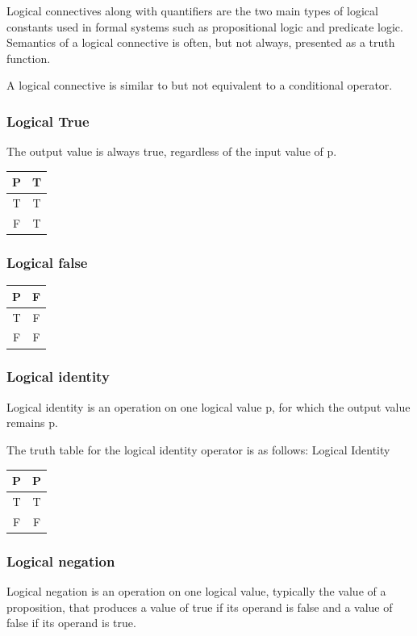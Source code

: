 \documentclass{article}
\begin{document}
Logical connectives along with quantifiers are the two main types of logical constants used in formal systems such as propositional logic and predicate logic. Semantics of a logical connective is often, but not always, presented as a truth function.

A logical connective is similar to but not equivalent to a conditional operator.
\subsubsection{Logical True}
The output value is always true, regardless of the input value of p.


\begin{center}
\begin{tabular}{ |c|c|} 
\hline
P&T \\ 
\hline
T&T \\ 
\hline
F&T \\ 
\hline
\end{tabular}
\end{center}
\subsubsection{Logical false}

 \begin{center}
\begin{tabular}{ |c|c|} 
\hline
P&F \\ 
\hline
T&F \\ 
\hline
F&F \\ 
\hline
\end{tabular}
\end{center}
\subsubsection{Logical identity}
Logical identity is an operation on one logical value p, for which the output value remains p.

The truth table for the logical identity operator is as follows:
Logical Identity 
 \begin{center}
\begin{tabular}{ |c|c|} 
\hline
P&P \\ 
\hline
T&T \\ 
\hline
F&F \\ 
\hline
\end{tabular}
\end{center}
\subsubsection{Logical negation}
Logical negation is an operation on one logical value, typically the value of a proposition, that produces a value of true if its operand is false and a value of false if its operand is true.
\end{document}
